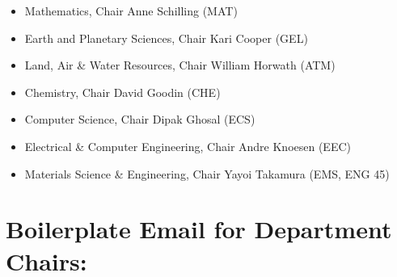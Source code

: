 \documentclass[12pt]{article}
\begin{document}
\begin{itemize}
\item Mathematics, Chair Anne Schilling (MAT) 
\item Earth and Planetary Sciences, Chair Kari Cooper (GEL) 
\item Land, Air \& Water Resources, Chair William Horwath (ATM)
\item Chemistry, Chair David Goodin (CHE)
\item Computer Science, Chair Dipak Ghosal (ECS)
\item Electrical \& Computer Engineering, Chair Andre Knoesen (EEC)
\item Materials Science \& Engineering, Chair Yayoi Takamura (EMS, ENG 45)
\end{itemize}

\newpage

\section{Boilerplate Email for Department Chairs:}
\end{document}
